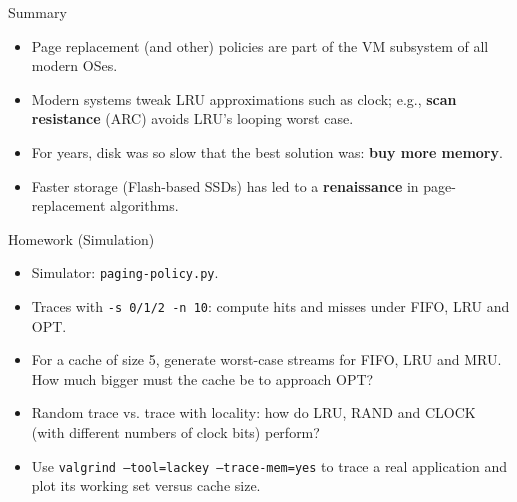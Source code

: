 \begin{frame}{Summary}

\begin{itemize}
    \item Page replacement (and other) policies are part of the VM subsystem
          of all modern OSes.
    \item Modern systems tweak LRU approximations such as clock; e.g.,
          \textbf{scan resistance} (ARC) avoids LRU's looping worst case.
    \item For years, disk was so slow that the best solution was:
          \textbf{buy more memory}.
    \item Faster storage (Flash-based SSDs) has led to a
          \textbf{renaissance} in page-replacement algorithms.
\end{itemize}

\end{frame}

\begin{frame}{Homework (Simulation)}

\begin{itemize}
    \item Simulator: \texttt{paging-policy.py}.
    \item Traces with \texttt{-s 0/1/2 -n 10}: compute hits and misses
          under FIFO, LRU and OPT.
    \item For a cache of size 5, generate worst-case streams for FIFO, LRU and
          MRU. How much bigger must the cache be to approach OPT?
    \item Random trace vs. trace with locality: how do LRU, RAND and CLOCK
          (with different numbers of clock bits) perform?
    \item Use \texttt{valgrind --tool=lackey --trace-mem=yes} to trace a real
          application and plot its working set versus cache size.
\end{itemize}

\end{frame}
